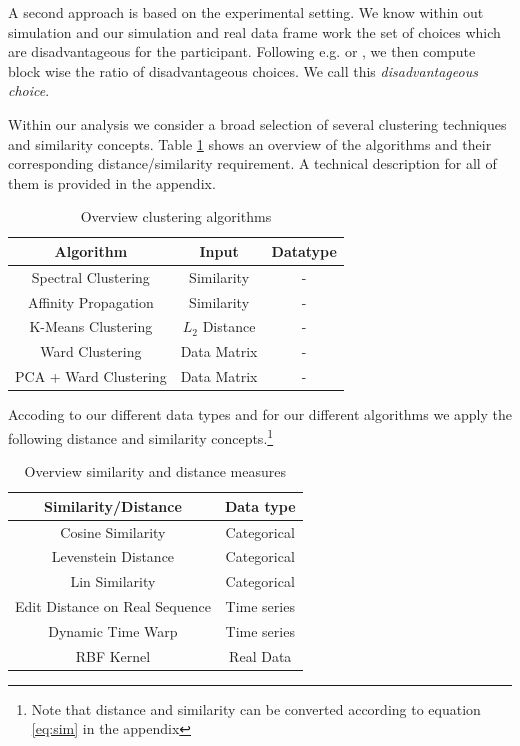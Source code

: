 \documentclass[12pt,a4paper,bibliography=totocnumbered,listof=totocnumbered]{scrartcl}
\begin{document}
A second approach is based on the experimental setting. We know within out simulation and our simulation and real data frame work the set of choices which are disadvantageous for the participant. Following e.g. \cite{Yechiam2008} or \cite{Ahn2008}, we then compute block wise the ratio of disadvantageous choices. We call this \textit{disadvantageous choice}. 

Within our analysis we consider a broad selection of several clustering techniques and similarity concepts. Table \ref{tab:cla} shows an overview of the algorithms and their corresponding distance/similarity requirement. A technical description for all of them is provided in the appendix. 

\begin{table}[!htb]
	\centering
	\begin{tabular}{|c| c| c |}
		\toprule 
		\textbf{Algorithm} & Input & Datatype  \\
		\hline
		Spectral Clustering & Similarity  & -  \\
		Affinity Propagation & Similarity  & -  \\
		K-Means Clustering & $L_2$ Distance  & -  \\
		Ward Clustering & Data Matrix & -  \\
		PCA + 	Ward Clustering   & Data Matrix & -  \\
		\bottomrule
	\end{tabular}
	\caption{Overview clustering algorithms}
	\label{tab:cla}
\end{table}

Accoding to our different data types and for our different algorithms we apply the following distance and similarity concepts.\footnote{Note that distance and similarity can be converted according to equation \eqref{eq:sim} in the appendix}


\begin{table}[!htb]
	\centering
	\begin{tabular}{c| c}
		\toprule 
		\hline
		\textbf{Similarity/Distance} & \textbf{Data type} \\
		\hline
		Cosine Similarity & Categorical \\
		Levenstein Distance & Categorical \\
		Lin Similarity & Categorical \\
		Edit Distance on Real Sequence  & Time series \\
		Dynamic Time Warp & Time series \\
		RBF Kernel & Real Data\\
		\bottomrule
	\end{tabular}
	\caption{Overview similarity and distance measures}
	\label{tab:simue}
\end{table}
\end{document}
